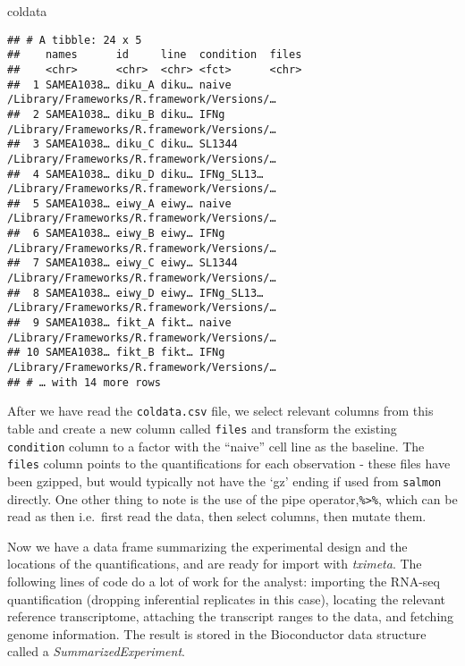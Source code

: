 \documentclass[
  9pt,
  a4paper,
]{extarticle}
\newenvironment{Shaded}{\begin{snugshade}}{\end{snugshade}}
\newcommand{\NormalTok}[1]{#1}
\begin{document}
\begin{Shaded}
\begin{Highlighting}[]
\NormalTok{coldata}
\end{Highlighting}
\end{Shaded}

\begin{verbatim}
## # A tibble: 24 x 5
##    names      id     line  condition  files                                     
##    <chr>      <chr>  <chr> <fct>      <chr>                                     
##  1 SAMEA1038… diku_A diku… naive      /Library/Frameworks/R.framework/Versions/…
##  2 SAMEA1038… diku_B diku… IFNg       /Library/Frameworks/R.framework/Versions/…
##  3 SAMEA1038… diku_C diku… SL1344     /Library/Frameworks/R.framework/Versions/…
##  4 SAMEA1038… diku_D diku… IFNg_SL13… /Library/Frameworks/R.framework/Versions/…
##  5 SAMEA1038… eiwy_A eiwy… naive      /Library/Frameworks/R.framework/Versions/…
##  6 SAMEA1038… eiwy_B eiwy… IFNg       /Library/Frameworks/R.framework/Versions/…
##  7 SAMEA1038… eiwy_C eiwy… SL1344     /Library/Frameworks/R.framework/Versions/…
##  8 SAMEA1038… eiwy_D eiwy… IFNg_SL13… /Library/Frameworks/R.framework/Versions/…
##  9 SAMEA1038… fikt_A fikt… naive      /Library/Frameworks/R.framework/Versions/…
## 10 SAMEA1038… fikt_B fikt… IFNg       /Library/Frameworks/R.framework/Versions/…
## # … with 14 more rows
\end{verbatim}

After we have read the \texttt{coldata.csv} file, we select relevant columns from this
table and create a new column called \texttt{files} and transform the existing
\texttt{condition} column to a factor with the ``naive'' cell line as the baseline. The
\texttt{files} column points to the quantifications for each observation - these files
have been gzipped, but would typically not have the `gz' ending if used from
\texttt{salmon} directly. One other thing to note is the use of the pipe
operator,\texttt{\%\textgreater{}\%}, which can be read as then i.e.~first read the data, then select
columns, then mutate them.

Now we have a data frame summarizing the experimental design and the locations
of the quantifications, and are ready for import with \emph{tximeta}. The following
lines of code do a lot of work for the analyst: importing the RNA-seq
quantification (dropping inferential replicates in this case), locating the
relevant reference transcriptome, attaching the transcript ranges to the data,
and fetching genome information. The result is stored in the Bioconductor data
structure called a \emph{SummarizedExperiment}.
\end{document}
